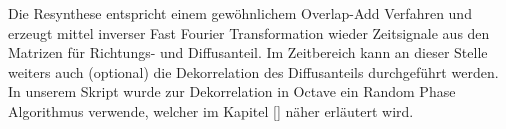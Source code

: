 Die Resynthese entspricht einem gewöhnlichem Overlap-Add Verfahren und erzeugt mittel inverser Fast Fourier Transformation wieder Zeitsignale aus den Matrizen für Richtungs- und Diffusanteil. Im Zeitbereich kann an dieser Stelle weiters auch (optional) die Dekorrelation des Diffusanteils durchgeführt werden. In unserem Skript wurde zur Dekorrelation in Octave ein Random Phase Algorithmus verwende, welcher im Kapitel \ref{} näher erläutert wird.